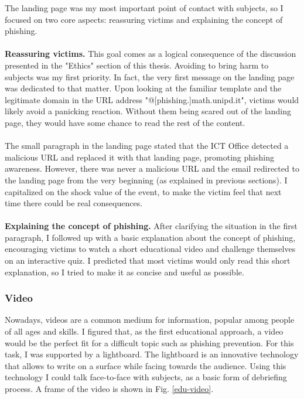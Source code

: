 \documentclass[a4paper]{article}
\begin{document}
\noindent
The landing page was my most important point of contact with subjects, so I focused on two core aspects: reassuring victims and explaining the concept of phishing.
\\ \\
\textbf{Reassuring victims.} This goal comes as a logical consequence of the discussion presented in the "Ethics" section of this thesis. Avoiding to bring harm to subjects was my first priority. In fact, the very first message on the landing page was dedicated to that matter. Upon looking at the familiar template and the legitimate domain in the URL address "@[phishing.]math.unipd.it", victims would likely avoid a panicking reaction. Without them being scared out of the landing page, they would have some chance to read the rest of the content.
\\ \\
The small paragraph in the landing page stated that the ICT Office detected a malicious URL and replaced it with that landing page, promoting phishing awareness. However, there was never a malicious URL and the email redirected to the landing page from the very beginning (as explained in previous sections). I capitalized on the shock value of the event, to make the victim feel that next time there could be real consequences.
\\ \\
\textbf{Explaining the concept of phishing.} After clarifying the situation in the first paragraph, I followed up with a basic explanation about the concept of phishing, encouraging victims to watch a short educational video and challenge themselves on an interactive quiz. I predicted that most victims would only read this short explanation, so I tried to make it as concise and useful as possible.

\subsubsection{Video}

\noindent
Nowadays, videos are a common medium for information, popular among people of all ages and skills. I figured that, as the first educational approach, a video would be the perfect fit for a difficult topic such as phishing prevention. For this task, I was supported by a lightboard. The lightboard is an innovative technology that allows to write on a surface while facing towards the audience. Using this technology I could talk face-to-face with subjects, as a basic form of debriefing process. A frame of the video is shown in Fig. \ref{edu-video}.
\end{document}
